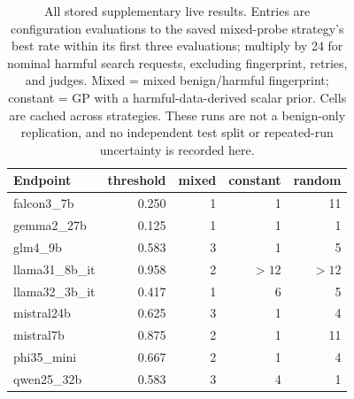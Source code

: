 \begin{table}[t]\centering\small
\caption{All stored supplementary live results. Entries are configuration evaluations to the saved mixed-probe strategy's best rate within its first three evaluations; multiply by 24 for nominal harmful search requests, excluding fingerprint, retries, and judges. Mixed = mixed benign/harmful fingerprint; constant = GP with a harmful-data-derived scalar prior. Cells are cached across strategies. These runs are not a benign-only replication, and no independent test split or repeated-run uncertainty is recorded here.}
\label{tab:liveqe}
\begin{tabular}{lrrrr}\toprule
Endpoint & threshold & mixed & constant & random \\\midrule
falcon3\_7b & 0.250 & 1 & 1 & 11 \\
gemma2\_27b & 0.125 & 1 & 1 & 1 \\
glm4\_9b & 0.583 & 3 & 1 & 5 \\
llama31\_8b\_it & 0.958 & 2 & $>12$ & $>12$ \\
llama32\_3b\_it & 0.417 & 1 & 6 & 5 \\
mistral24b & 0.625 & 3 & 1 & 4 \\
mistral7b & 0.875 & 2 & 1 & 11 \\
phi35\_mini & 0.667 & 2 & 1 & 4 \\
qwen25\_32b & 0.583 & 3 & 4 & 1 \\
\bottomrule\end{tabular}\end{table}
